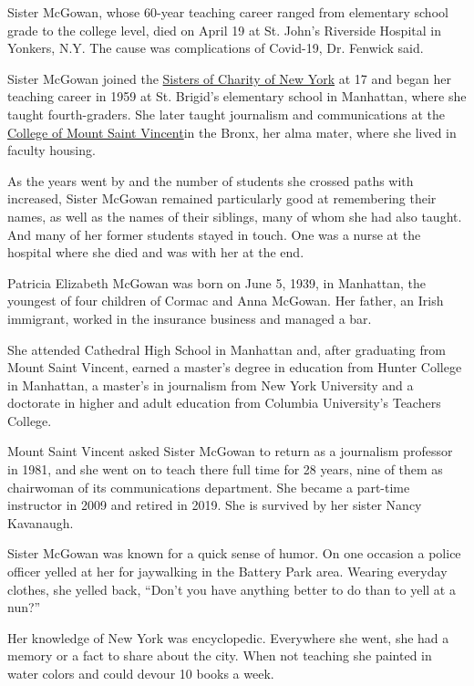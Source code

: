 Sister McGowan, whose 60-year teaching career ranged from elementary
school grade to the college level, died on April 19 at St. John's
Riverside Hospital in Yonkers, N.Y. The cause was complications of
Covid-19, Dr. Fenwick said.

Sister McGowan joined the
\href{https://www.scny.org/in-memoriam-sister-patricia-mcgowan-sc/}{Sisters
of Charity of New York} at 17 and began her teaching career in 1959 at
St. Brigid's elementary school in Manhattan, where she taught
fourth-graders. She later taught journalism and communications at the
\href{https://mountsaintvincent.edu/}{College of Mount Saint Vincent}in
the Bronx, her alma mater, where she lived in faculty housing.

As the years went by and the number of students she crossed paths with
increased, Sister McGowan remained particularly good at remembering
their names, as well as the names of their siblings, many of whom she
had also taught. And many of her former students stayed in touch. One
was a nurse at the hospital where she died and was with her at the end.

Patricia Elizabeth McGowan was born on June 5, 1939, in Manhattan, the
youngest of four children of Cormac and Anna McGowan. Her father, an
Irish immigrant, worked in the insurance business and managed a bar.

She attended Cathedral High School in Manhattan and, after graduating
from Mount Saint Vincent, earned a master's degree in education from
Hunter College in Manhattan, a master's in journalism from New York
University and a doctorate in higher and adult education from Columbia
University's Teachers College.

Mount Saint Vincent asked Sister McGowan to return as a journalism
professor in 1981, and she went on to teach there full time for 28
years, nine of them as chairwoman of its communications department. She
became a part-time instructor in 2009 and retired in 2019. She is
survived by her sister Nancy Kavanaugh.

Sister McGowan was known for a quick sense of humor. On one occasion a
police officer yelled at her for jaywalking in the Battery Park area.
Wearing everyday clothes, she yelled back, ``Don't you have anything
better to do than to yell at a nun?''

Her knowledge of New York was encyclopedic. Everywhere she went, she had
a memory or a fact to share about the city. When not teaching she
painted in water colors and could devour 10 books a week.

